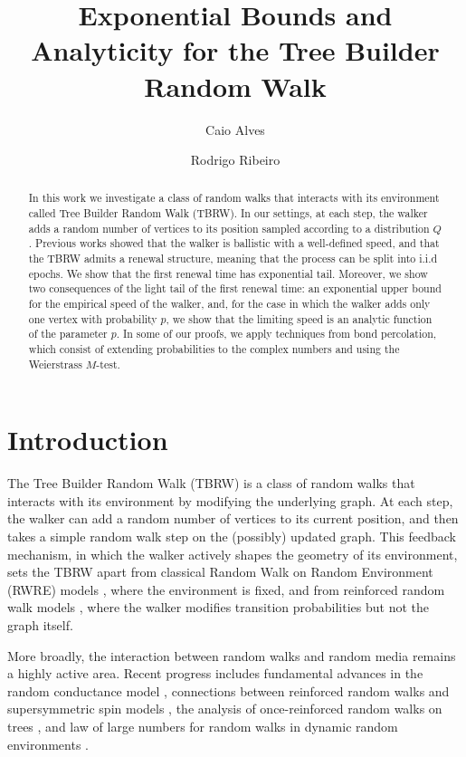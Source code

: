 \documentclass[a4paper]{amsart}
\title{Exponential Bounds and Analyticity for the Tree Builder Random Walk}
\author{Caio Alves}
\author{Rodrigo Ribeiro}
\begin{document}
\begin{abstract}
    In this work we investigate a class of random walks that interacts with its environment called Tree Builder Random Walk (TBRW). In our settings, at each step, the walker adds a random number of vertices to its position sampled according to a distribution $Q$. Previous works showed that the walker is ballistic with a well-defined speed, and that the TBRW admits a renewal structure, meaning that the process can be split into i.i.d epochs. We show that the first renewal time has exponential tail. Moreover, we show two consequences of the light tail of the first renewal time:  an exponential upper bound for the empirical speed of the walker, and, for the case in which the walker adds only one vertex with probability $p$, we show that the limiting speed is an analytic function of the parameter $p$. In some of our proofs, we apply techniques from bond percolation, which consist of extending probabilities to the complex numbers and using the Weierstrass $M$-test. 
\end{abstract}

\maketitle

\section{Introduction}

The Tree Builder Random Walk (TBRW) is a class of random walks that interacts with its environment by modifying the underlying graph. At each step, the walker can add a random number of vertices to its current position, and then takes a simple random walk step on the (possibly) updated graph. This feedback mechanism, in which the walker actively shapes the geometry of its environment, sets the TBRW apart from classical Random Walk on Random Environment (RWRE) models \cite{solomon1975,zeitouni2004}, where the environment is fixed, and from reinforced random walk models \cite{pemantle2007}, where the walker modifies transition probabilities but not the graph itself.

More broadly, the interaction between random walks and random media remains a highly active area. Recent progress includes fundamental advances in the random conductance model \cite{biskup2011}, connections between reinforced random walks and supersymmetric spin models \cite{sabot2015}, the analysis of once-reinforced random walks on trees \cite{collevecchio2020}, and law of large numbers for random walks in dynamic random environments \cite{avena2009}. 
\end{document}
